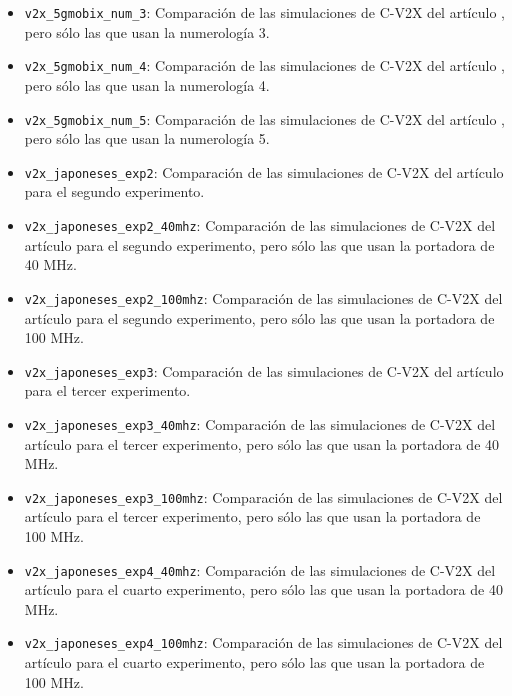 \documentclass[12pt]{report} %
\begin{document}
\begin{itemize}
Comparación de las simulaciones de C-V2X del artículo \cite{RefWorks:25},
pero sólo las que usan la numerología 2.
\item \verb|v2x_5gmobix_num_3|:
Comparación de las simulaciones de C-V2X del artículo \cite{RefWorks:25},
pero sólo las que usan la numerología 3.
\item \verb|v2x_5gmobix_num_4|:
Comparación de las simulaciones de C-V2X del artículo \cite{RefWorks:25},
pero sólo las que usan la numerología 4.
\item \verb|v2x_5gmobix_num_5|:
Comparación de las simulaciones de C-V2X del artículo \cite{RefWorks:25},
pero sólo las que usan la numerología 5.
\item \verb|v2x_japoneses_exp2|:
Comparación de las simulaciones de C-V2X del artículo \cite{RefWorks:49}
para el segundo experimento.
\item \verb|v2x_japoneses_exp2_40mhz|:
Comparación de las simulaciones de C-V2X del artículo \cite{RefWorks:49}
para el segundo experimento, pero sólo las que usan la portadora de 40 MHz.
\item \verb|v2x_japoneses_exp2_100mhz|:
Comparación de las simulaciones de C-V2X del artículo \cite{RefWorks:49}
para el segundo experimento, pero sólo las que usan la portadora de 100 MHz.
\item \verb|v2x_japoneses_exp3|:
Comparación de las simulaciones de C-V2X del artículo \cite{RefWorks:49}
para el tercer experimento.
\item \verb|v2x_japoneses_exp3_40mhz|:
Comparación de las simulaciones de C-V2X del artículo \cite{RefWorks:49}
para el tercer experimento, pero sólo las que usan la portadora de 40 MHz.
\item \verb|v2x_japoneses_exp3_100mhz|:
Comparación de las simulaciones de C-V2X del artículo \cite{RefWorks:49}
para el tercer experimento, pero sólo las que usan la portadora de 100 MHz.
\item \verb|v2x_japoneses_exp4_40mhz|:
Comparación de las simulaciones de C-V2X del artículo \cite{RefWorks:49}
para el cuarto experimento, pero sólo las que usan la portadora de 40 MHz.
\item \verb|v2x_japoneses_exp4_100mhz|:
Comparación de las simulaciones de C-V2X del artículo \cite{RefWorks:49}
para el cuarto experimento, pero sólo las que usan la portadora de 100 MHz.

\end{itemize}
\end{document}
